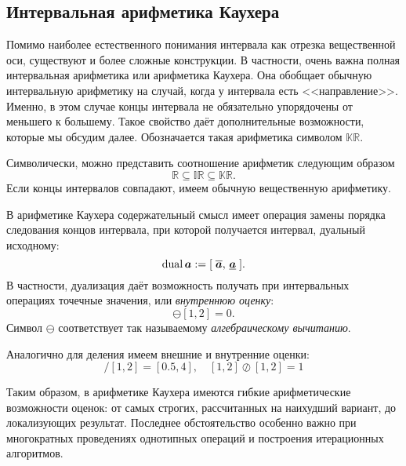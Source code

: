 \documentclass[a5paper,openany]{book}
\newcommand{\mbf}[1]{\protect\text{\boldmath$#1$}}
\newcommand{\mbb}{\mathbb}
\newcommand{\ov}{\overline}
\newcommand{\un}{\underline}
\newcommand{\dual}{\mathrm{dual}\,}
\begin{document}
\subsection{Интервальная арифметика Каухера}

Помимо наиболее естественного понимания интервала как отрезка вещественной оси, существуют и более сложные конструкции. В частности, очень важна полная интервальная арифметика или арифметика Каухера. Она обобщает обычную интервальную арифметику на случай, когда у интервала есть <<направление>>. Именно, в этом случае концы интервала не обязательно упорядочены от меньшего к большему. Такое свойство даёт дополнительные возможности, которые мы обсудим далее. Обозначается такая арифметика символом $\mbb{KR}$. 

Символически, можно представить соотношение арифметик следующим образом
$$ \mbb{R} \subseteq \mbb{IR} \subseteq \mbb{KR}. $$
Если концы интервалов совпадают, имеем обычную вещественную арифметику.

В арифметике Каухера содержательный смысл имеет операция замены порядка следования концов интервала, при которой получается интервал, дуальный исходному: 
\begin{equation*}
\label{Dualization}
\dual\mbf{a} := [\;\ov{\mbf{a}},\,\un{\mbf{a}}\;].
\end{equation*}
В частности, дуализация даёт возможность получать при интервальных операциях точечные значения, или \emph{внутреннюю оценку}:
\begin{equation*}
[1,2] \ominus [1,2]=0.
\end{equation*}
Символ $\ominus$ соответствует так называемому \emph{алгебраическому вычитанию}.  

Аналогично для деления имеем внешние и внутренние оценки: 
\begin{equation*}
[1,2] / [1,2]= [0.5, 4], \quad [1,2] \oslash [1,2]= 1
\end{equation*}

Таким образом, в арифметике Каухера имеются гибкие арифметические возможности  оценок: от самых строгих, рассчитанных на наихудший вариант, до локализующих результат. Последнее обстоятельство особенно важно при многократных проведениях однотипных операций и построения итерационных алгоритмов. 
\end{document}
